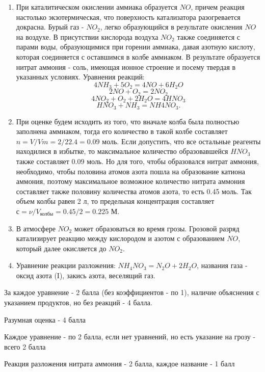 \solutionSection

\begin{enumerate}
    \item При каталитическом окислении аммиака образуется $NO$, причем реакция настолько экзотермическая, 
    что поверхность катализатора разогревается докрасна. Бурый газ - $NO_2$, легко образующийся в 
    результате окисления $NO$ на воздухе. В присутствии кислорода воздуха $NO_2$ также соединяется с парами воды, 
    образующимися при горении аммиака, давая азотную кислоту, которая соединяется с оставшимся в колбе аммиаком. 
    В результате образуется нитрат аммония - соль, имеющая ионное строение и посему твердая в указанных условиях.
    Уравнения реакций:
    $$4NH_3 + 5O_2 = 4NO + 6H_2O$$
    $$2NO + O_2 = 2NO_2$$
    $$4NO_2 + O_2 + 2H_2O = 4HNO_3$$
    $$HNO_3 + NH_3 = NH4NO_3.$$
    \item При оценке будем исходить из того, что вначале колба была полностью заполнена аммиаком, тогда его количество в такой 
    колбе составляет $n = V/Vm = 2/22.4 = 0.09$ моль. Если допустить, что все остальные реагенты находилися в 
    избытке, то максимальное количество образовавшейся $HNO_3$ также составляет 0.09 моль. Но для того, чтобы 
    образовался нитрат аммония, необходимо, чтобы половина атомов азота пошла на образование катиона аммония, 
    поэтому максимальное возможное количество нитрата аммония составляет также половину количества атомов азота, 
    то есть 0.45 моль. Так объем колбы равен 2 л, то предельная концентрация составляет $с = ν/V_{\text{колбы}}=0.45/2 = 0.225$ М.
    \item В атмосфере $NO_2$ может образоваться во время грозы. Грозовой разряд катализирует реакцию между кислородом и азотом с образованием $NO$, 
    который далее окисляется до $NO_2$.
    \item Уравнение реакции разложения:  $NH_4NO_3 = N_2O + 2H_2O$, названия газа - оксид азота (I), закись азота, 
    веселящий газ.
\end{enumerate}

За каждое уравнение - 2 балла (без коэффициентов - по 1), наличие объяснения с указанием продуктов, но без реакций - 4 балла.

Разумная оценка - 4 балла

Каждое уравнение - по 2 балла, если нет уравнений, но есть указание на грозу - всего 2 балла

Реакция разложения нитрата аммония - 2 балла, каждое название - 1 балл
